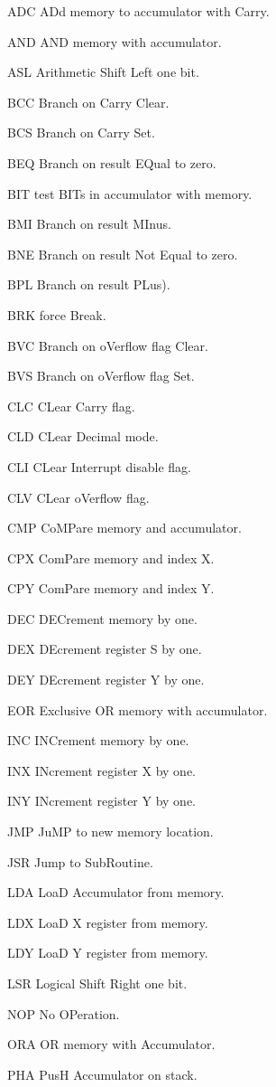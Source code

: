 \documentclass[12pt,oneside]{book}
\begin{document}
ADC ADd memory to accumulator with Carry.

AND AND memory with accumulator.

ASL Arithmetic Shift Left one bit.

BCC Branch on Carry Clear.

BCS Branch on Carry Set.

BEQ Branch on result EQual to zero.

BIT test BITs in accumulator with memory.

BMI Branch on result MInus.

BNE Branch on result Not Equal to zero.

BPL Branch on result PLus).

BRK force Break.

BVC Branch on oVerflow flag Clear.

BVS Branch on oVerflow flag Set.

CLC CLear Carry flag.

CLD CLear Decimal mode.

CLI CLear Interrupt disable flag.

CLV CLear oVerflow flag.

CMP CoMPare memory and accumulator.

CPX ComPare memory and index X.

CPY ComPare memory and index Y.

DEC DECrement memory by one.

DEX DEcrement register S by one.

DEY DEcrement register Y by one.

EOR Exclusive OR memory with accumulator.

INC INCrement memory by one.

INX INcrement register X by one.

INY INcrement register Y by one.

JMP JuMP to new memory location.

JSR Jump to SubRoutine.

LDA LoaD Accumulator from memory.

LDX LoaD X register from memory.

LDY LoaD Y register from memory.

LSR Logical Shift Right one bit.

NOP No OPeration.

ORA OR memory with Accumulator.

PHA PusH Accumulator on stack.
\end{document}
